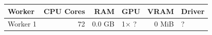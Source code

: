 \begin{tabular}{lrrlrl}
\toprule
Worker & CPU Cores & RAM & GPU & VRAM & Driver \\
\midrule
Worker 1 & 72 & 0.0 GB & 1× ? & 0 MiB & ? \\
\bottomrule
\end{tabular}